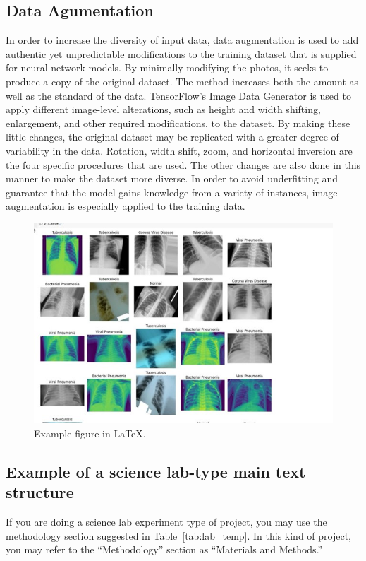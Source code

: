 \subsection{Data Agumentation}
In order to increase the diversity of input data, data augmentation is used to add authentic yet unpredictable modifications to the training dataset that is supplied for neural network models. By minimally modifying the photos, it seeks to produce a copy of the original dataset. The method increases both the amount as well as the standard of the data. TensorFlow's Image Data Generator is used to apply different image-level alterations, such as height and width shifting, enlargement, and other required modifications, to the dataset. By making these little changes, the original dataset may be replicated with a greater degree of variability in the data. Rotation, width shift, zoom, and horizontal inversion are the four specific procedures that are used. The other changes are also done in this manner to make the dataset more diverse. In order to avoid underfitting and guarantee that the model gains knowledge from a variety of instances, image augmentation is especially applied to the training data.
\begin{figure}[ht]
    \centering
    \includegraphics[scale=0.3]{figures/scan .jpg}
    \caption{Example figure in \LaTeX.}
    \label{fig:chart_a}
\end{figure}


\subsection{Example of a science lab-type main text structure}
If you are doing a science lab experiment type of project, you may use the  methodology section suggested in Table~\ref{tab:lab_temp}. In this kind of project, you may refer to the ``Methodology'' section as ``Materials and Methods.''


